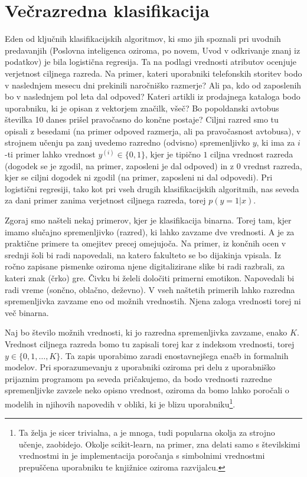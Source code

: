 \chapter{Večrazredna klasifikacija}

Eden od ključnih klasifikacijskih algoritmov, ki smo jih spoznali pri uvodnih predavanjih (Poslovna inteligenca oziroma, po novem, Uvod v odkrivanje znanj iz podatkov) je bila logistična regresija. Ta na podlagi vrednosti atributov ocenjuje verjetnost ciljnega razreda. Na primer, kateri uporabniki telefonskih storitev bodo v naslednjem mesecu dni prekinili naročniško razmerje? Ali pa, kdo od zaposlenih bo v naslednjem pol leta dal odpoved? Kateri artikli iz prodajnega kataloga bodo uporabniku, ki je opisan z vektorjem značilk, všeč? Bo popoldanski avtobus številka 10 danes prišel pravočasno do končne postaje? Ciljni razred smo tu opisali z besedami (na primer odpoved razmerja, ali pa pravočasnost avtobusa), v strojnem učenju pa zanj uvedemo razredno (odvisno) spremenljivko $y$, ki ima za $i$-ti primer lahko vrednost $y^{(i)}\in\{0,1\}$, kjer je tipično $1$ ciljna vrednost razreda (dogodek se je zgodil, na primer, zaposleni je dal odpoved) in z $0$ vrednst razreda, kjer se ciljni dogodek ni zgodil (na primer, zaposleni ni dal odpovedi). Pri logistični regresiji, tako kot pri vseh drugih klasifikacijskih algoritmih, nas seveda za dani primer zanima verjetnost ciljnega razreda, torej $p(y=1|x)$.

Zgoraj smo našteli nekaj primerov, kjer je klasifikacija binarna. Torej tam, kjer imamo slučajno spremenljivko (razred), ki lahko zavzame dve vrednosti. A je za praktične primere ta omejitev precej omejujoča. Na primer, iz končnih ocen v srednji šoli bi radi napovedali, na katero fakulteto se bo dijakinja vpisala. Iz ročno zapisane pismenke oziroma njene digitalizirane slike bi radi razbrali, za kateri znak (črko) gre. Čivku bi želeli določiti primerni emotikon. Napovedali bi radi vreme (sončno, oblačno, deževno). V vseh naštetih primerih lahko razredna spremenljivka zavzame eno od možnih vrednostih. Njena zaloga vrednosti torej ni več binarna.

Naj bo število možnih vrednosti, ki jo razredna spremenljivka zavzame, enako $K$. Vrednost ciljnega razreda bomo tu zapisali torej kar z indeksom vrednosti, torej $y\in\{0,1,\ldots,K\}$. Ta zapis uporabimo zaradi enostavnejšega enačb in formalnih modelov. Pri sporazumevanju z uporabniki oziroma pri delu z uporabniško prijaznim programom pa seveda pričakujemo, da bodo vrednosti razredne spremenljivke zavzele neko opisno vrednost, oziroma da bomo lahko poročali o modelih in njihovih napovedih v obliki, ki je blizu uporabniku\footnote{Ta želja je sicer trivialna, a je mnoga, tudi popularna okolja za strojno učenje, zaobidejo. Okolje scikit-learn, na primer, zna delati samo s številskimi vrednostmi in je implementacija poročanja s simbolnimi vrednostmi prepuščena uporabniku te knjižnice oziroma razvijalcu.}.

